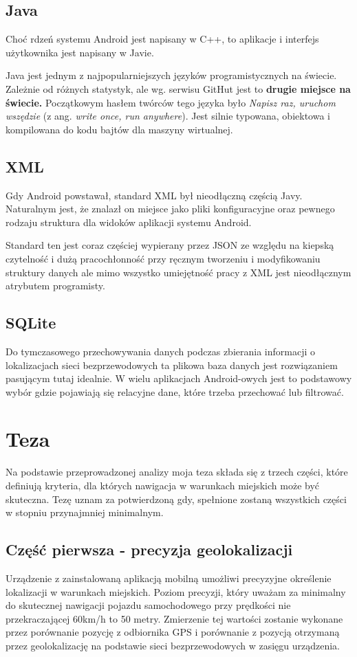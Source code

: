 \subsection{Java}
Choć rdzeń systemu Android jest napisany w C++, to aplikacje i interfejs użytkownika jest napisany w Javie.\cite{AndroidWiki}

Java jest jednym z najpopularniejszych języków programistycznych na świecie. Zależnie od różnych statystyk, ale wg. serwisu GitHut jest to \textbf{drugie miejsce na świecie.}\cite{GithutStats2017} Początkowym hasłem twórców tego języka było \textit{Napisz raz, uruchom wszędzie} (z ang. \textit{write once, run anywhere}). Jest silnie typowana, obiektowa i kompilowana do kodu bajtów dla maszyny wirtualnej.\cite{JavaWiki}

\subsection{XML}
Gdy Android powstawał, standard XML był nieodłączną częścią Javy. Naturalnym jest, że znalazł on miejsce jako pliki konfiguracyjne oraz pewnego rodzaju struktura dla widoków aplikacji systemu Android.

Standard ten jest coraz częściej wypierany przez JSON ze względu na kiepską czytelność i dużą pracochłonność przy ręcznym tworzeniu i modyfikowaniu struktury danych ale mimo wszystko umiejętność pracy z XML jest nieodłącznym atrybutem programisty.

\subsection{SQLite}
Do tymczasowego przechowywania danych podczas zbierania informacji o lokalizacjach sieci bezprzewodowych ta plikowa baza danych jest rozwiązaniem pasującym tutaj idealnie. W wielu aplikacjach Android-owych jest to podstawowy wybór gdzie pojawiają się relacyjne dane, które trzeba przechować lub filtrować.

\section{Teza}
Na podstawie przeprowadzonej analizy moja teza składa się z trzech części, które definiują kryteria, dla których nawigacja w warunkach miejskich może być skuteczna. Tezę uznam za potwierdzoną gdy, spełnione zostaną wszystkich części w stopniu przynajmniej minimalnym.

\subsection{Część pierwsza - precyzja geolokalizacji}
Urządzenie z zainstalowaną aplikacją mobilną umożliwi precyzyjne określenie lokalizacji w warunkach miejskich. Poziom precyzji, który uważam za minimalny do skutecznej nawigacji pojazdu samochodowego przy prędkości nie przekraczającej 60km/h to 50 metry. Zmierzenie tej wartości zostanie wykonane przez porównanie pozycję z odbiornika GPS i porównanie z pozycją otrzymaną przez geolokalizację na podstawie sieci bezprzewodowych w zasięgu urządzenia.

